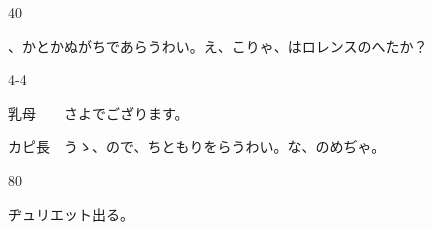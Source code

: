 \documentclass[tate,paper=b6j,jafontsize=9pt]{jlreq}
\begin{document}
\begin{azconvIndented}{4\zw}{0\zw}

、かとかぬがちであらうわい。え、こりゃ、はロレンスのへたか？

\end{azconvIndented}
\begin{azconvIndented}{4\zw}{-4\zw}

乳母　　さよでござります。

カピ長　うゝ、ので、ちともりをらうわい。な、のめぢゃ。

\end{azconvIndented}
\begin{azconvIndented}{8\zw}{0\zw}

ヂュリエット出る。

\end{azconvIndented}
\end{document}

